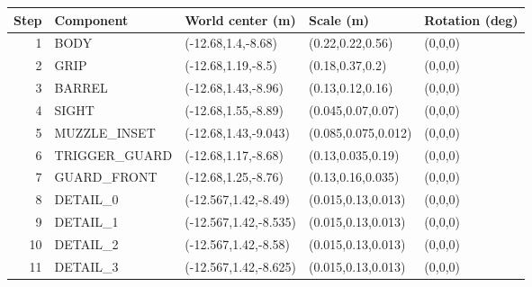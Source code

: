 \begin{center}\normalsize\begin{tabular}{rllll}\toprule
Step & Component & World center (m) & Scale (m) & Rotation (deg) \\\midrule
1 & BODY & (-12.68,1.4,-8.68) & (0.22,0.22,0.56) & (0,0,0) \\
2 & GRIP & (-12.68,1.19,-8.5) & (0.18,0.37,0.2) & (0,0,0) \\
3 & BARREL & (-12.68,1.43,-8.96) & (0.13,0.12,0.16) & (0,0,0) \\
4 & SIGHT & (-12.68,1.55,-8.89) & (0.045,0.07,0.07) & (0,0,0) \\
5 & MUZZLE\_INSET & (-12.68,1.43,-9.043) & (0.085,0.075,0.012) & (0,0,0) \\
6 & TRIGGER\_GUARD & (-12.68,1.17,-8.68) & (0.13,0.035,0.19) & (0,0,0) \\
7 & GUARD\_FRONT & (-12.68,1.25,-8.76) & (0.13,0.16,0.035) & (0,0,0) \\
8 & DETAIL\_0 & (-12.567,1.42,-8.49) & (0.015,0.13,0.013) & (0,0,0) \\
9 & DETAIL\_1 & (-12.567,1.42,-8.535) & (0.015,0.13,0.013) & (0,0,0) \\
10 & DETAIL\_2 & (-12.567,1.42,-8.58) & (0.015,0.13,0.013) & (0,0,0) \\
11 & DETAIL\_3 & (-12.567,1.42,-8.625) & (0.015,0.13,0.013) & (0,0,0) \\
\bottomrule\end{tabular}\end{center}
